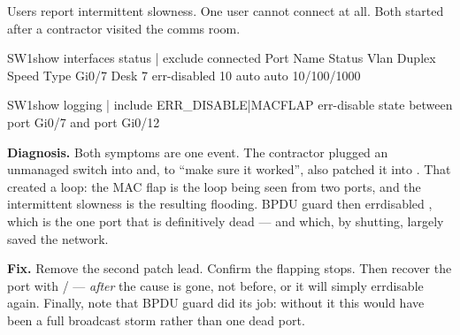 \begin{breakfix}
Users report intermittent slowness. One user cannot connect at all. Both started
after a contractor visited the comms room.

\begin{verify}{SW1}{show interfaces status | exclude connected}
Port      Name               Status       Vlan       Duplex  Speed Type
Gi0/7     Desk 7             err-disabled 10           auto   auto 10/100/1000
\end{verify}

\begin{verify}{SW1}{show logging | include ERR\_DISABLE|MACFLAP}
   err-disable state
   between port Gi0/7 and port Gi0/12
\end{verify}

\textbf{Diagnosis.} Both symptoms are one event. The contractor plugged an
unmanaged switch into  and, to ``make sure it worked'', also patched it
into . That created a loop: the MAC flap is the loop being seen from
two ports, and the intermittent slowness is the resulting flooding. BPDU guard
then errdisabled , which is the one port that is definitively dead ---
and which, by shutting, largely saved the network.

\textbf{Fix.} Remove the second patch lead. Confirm the flapping stops. Then
recover the port with  /  --- \emph{after} the
cause is gone, not before, or it will simply errdisable again. Finally, note that
BPDU guard did its job: without it this would have been a full broadcast storm
rather than one dead port.
\end{breakfix}


